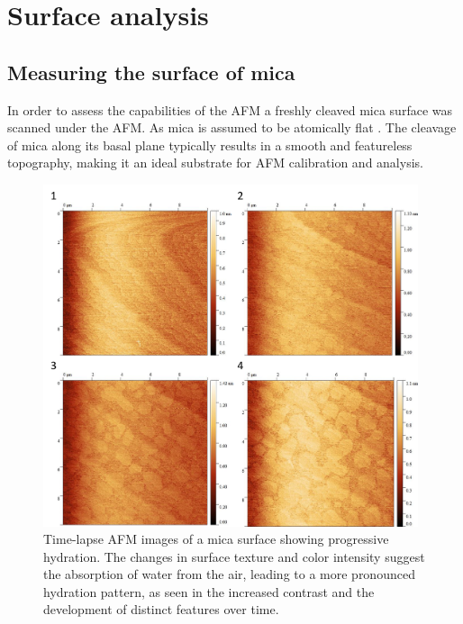 \section{Surface analysis}

\subsection{Measuring the surface of mica}

In order to assess the capabilities of the AFM a freshly cleaved mica surface was scanned under the AFM. As mica is assumed to be atomically flat \cite{MicaSurf, Ostendorf_2008}. The cleavage of mica along its basal plane typically results in a smooth and featureless topography, making it an ideal substrate for AFM calibration and analysis.

\begin{figure}[h!!!!!!!]     %
        \begin{center}
          \includegraphics[width=110mm]{chapter3/Mica hydration.png}
\end{center}
\caption{Time-lapse AFM images of a mica surface showing progressive hydration. The changes in surface texture and color intensity suggest the absorption of water from the air, leading to a more pronounced hydration pattern, as seen in the increased contrast and the development of distinct features over time.}
\label{fig:ImageAFM}                 %
\end{figure}

